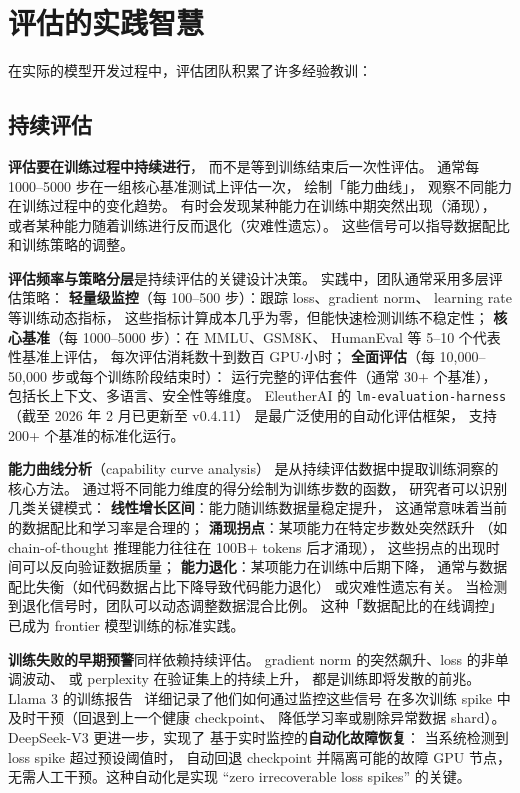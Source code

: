 \section{评估的实践智慧}

在实际的模型开发过程中，评估团队积累了许多经验教训：

\subsection{持续评估}

\textbf{评估要在训练过程中持续进行}，
而不是等到训练结束后一次性评估。
通常每 1000--5000 步在一组核心基准测试上评估一次，
绘制「能力曲线」，
观察不同能力在训练过程中的变化趋势。
有时会发现某种能力在训练中期突然出现（涌现），
或者某种能力随着训练进行反而退化（灾难性遗忘）。
这些信号可以指导数据配比和训练策略的调整。

\textbf{评估频率与策略分层}是持续评估的关键设计决策。
实践中，团队通常采用多层评估策略：
\textbf{轻量级监控}（每 100--500 步）：跟踪 loss、gradient norm、
learning rate 等训练动态指标，
这些指标计算成本几乎为零，但能快速检测训练不稳定性；
\textbf{核心基准}（每 1000--5000 步）：在 MMLU、GSM8K、
HumanEval 等 5--10 个代表性基准上评估，
每次评估消耗数十到数百 GPU$\cdot$小时；
\textbf{全面评估}（每 10,000--50,000 步或每个训练阶段结束时）：
运行完整的评估套件（通常 30+ 个基准），
包括长上下文、多语言、安全性等维度。
EleutherAI 的 \texttt{lm-evaluation-harness}（截至 2026 年 2 月已更新至 v0.4.11）
是最广泛使用的自动化评估框架，
支持 200+ 个基准的标准化运行。

\textbf{能力曲线分析}（capability curve analysis）
是从持续评估数据中提取训练洞察的核心方法。
通过将不同能力维度的得分绘制为训练步数的函数，
研究者可以识别几类关键模式：
\textbf{线性增长区间}：能力随训练数据量稳定提升，
这通常意味着当前的数据配比和学习率是合理的；
\textbf{涌现拐点}：某项能力在特定步数处突然跃升
（如 chain-of-thought 推理能力往往在 100B+ tokens 后才涌现），
这些拐点的出现时间可以反向验证数据质量；
\textbf{能力退化}：某项能力在训练中后期下降，
通常与数据配比失衡（如代码数据占比下降导致代码能力退化）
或灾难性遗忘有关。
当检测到退化信号时，团队可以动态调整数据混合比例。
这种「数据配比的在线调控」已成为
frontier 模型训练的标准实践。

\textbf{训练失败的早期预警}同样依赖持续评估。
gradient norm 的突然飙升、loss 的非单调波动、
或 perplexity 在验证集上的持续上升，
都是训练即将发散的前兆。
Llama 3 的训练报告~\cite{dubey2024llama3}
详细记录了他们如何通过监控这些信号
在多次训练 spike 中及时干预（回退到上一个健康 checkpoint、
降低学习率或剔除异常数据 shard）。
DeepSeek-V3 更进一步，实现了
基于实时监控的\textbf{自动化故障恢复}：
当系统检测到 loss spike 超过预设阈值时，
自动回退 checkpoint 并隔离可能的故障 GPU 节点，
无需人工干预。这种自动化是实现
“zero irrecoverable loss spikes” 的关键。


